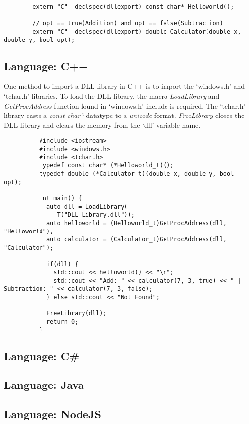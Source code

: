 \documentclass[conference]{IEEEtran}
\begin{document}
      \begin{lstlisting}
        extern "C" _declspec(dllexport) const char* Helloworld();

        // opt == true(Addition) and opt == false(Subtraction) 
        extern "C" _declspec(dllexport) double Calculator(double x, double y, bool opt);
      \end{lstlisting}
      \subsection{Language: C++}
        One method to import a DLL library in C++ is to import the `windows.h' and `tchar.h' libraries. To load the DLL library, the macro \textit{LoadLibrary} and \textit{GetProcAddress} function found in `windows.h' include is required. The `tchar.h' library casts a \textit{const char*} datatype to a \textit{unicode} format. \textit{FreeLibrary} closes the DLL library and clears the memory from the `dll' variable name.
        \begin{lstlisting}
          #include <iostream>
          #include <windows.h>
          #include <tchar.h>
          typedef const char* (*Helloworld_t)();
          typedef double (*Calculator_t)(double x, double y, bool opt);

          int main() {
            auto dll = LoadLibrary(
              _T("DLL_Library.dll"));
            auto helloworld = (Helloworld_t)GetProcAddress(dll, "Helloworld");
            auto calculator = (Calculator_t)GetProcAddress(dll, "Calculator");

            if(dll) {
              std::cout << helloworld() << "\n";
              std::cout << "Add: " << calculator(7, 3, true) << " | Subtraction: " << calculator(7, 3, false);
            } else std::cout << "Not Found";

            FreeLibrary(dll);
            return 0;  
          }
        \end{lstlisting}
      \subsection{Language: C\#}
      \subsection{Language: Java}
      \subsection{Language: NodeJS}
\end{document}
